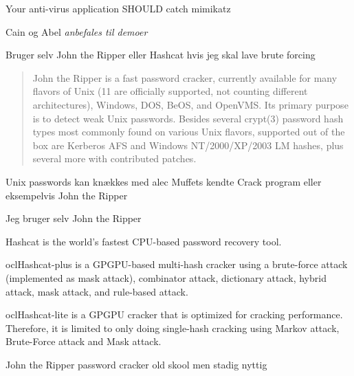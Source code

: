 \documentclass[Screen16to9,17pt]{foils}
\begin{document}
\centerline{Your anti-virus application SHOULD catch mimikatz}



\begin{list1}
\item Cain og Abel \emph{anbefales til demoer}  
\item Bruger selv John the Ripper eller Hashcat hvis jeg skal lave brute forcing
\end{list1}



\begin{quote}
John the Ripper is a fast password cracker, currently available for
many flavors of Unix (11 are officially supported, not counting
different architectures), Windows, DOS, BeOS, and OpenVMS. Its primary
purpose is to detect weak Unix passwords. Besides several crypt(3)
password hash types most commonly found on various Unix flavors,
supported out of the box are Kerberos AFS and Windows NT/2000/XP/2003
LM hashes, plus several more with contributed patches.
\end{quote}

\begin{list1}
\item Unix passwords kan knækkes med alec Muffets kendte Crack program
  eller eksempelvis John the Ripper 
\item Jeg bruger selv John the Ripper
\end{list1}


\begin{list2}
\item Hashcat is the world's fastest CPU-based password recovery tool.
\item oclHashcat-plus is a GPGPU-based multi-hash cracker using a brute-force attack (implemented as mask attack), combinator attack, dictionary attack, hybrid attack, mask attack, and rule-based attack.
\item oclHashcat-lite is a GPGPU cracker that is optimized for cracking performance. Therefore, it is limited to only doing single-hash cracking using Markov attack, Brute-Force attack and Mask attack.
\item John the Ripper password cracker old skool men stadig nyttig
\end{list2}
\end{document}
